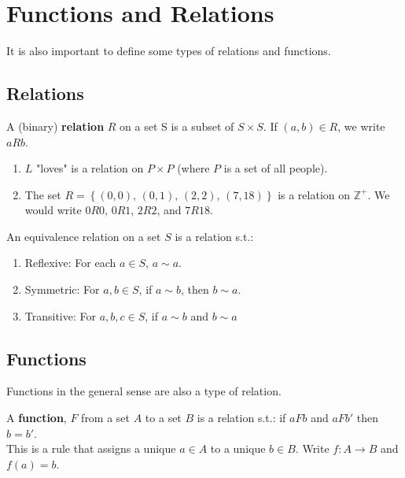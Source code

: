 \documentclass[../main.tex]{subfiles}
\begin{document}
\section{Functions and Relations}

It is also important to define some types of relations and functions.

\subsection{Relations}

\begin{definition}[Relation]
    A (binary) \textbf{relation} \( R \) on a set S is a subset of \( S \times S \). If \( (a,b) \in R \), we write \( aRb \).
\end{definition}

\begin{example}[of relations]

    \begin{enumerate}
        \item \( L \) "loves" is a relation on \( P \times P \) (where \( P \) is a set of all people).
        \item The set \( R = \left\{ (0,0), \, (0,1), \, (2,2), \, (7,18) \right\} \) is a relation on \( \mathbb{Z}^+ \). We would write \( 0R0 \), \( 0R1 \), \( 2R2 \), and \( 7R18 \).
    \end{enumerate}
\end{example}

\begin{definition}
    An equivalence relation on a set \( S \) is a relation s.t.:
    \begin{enumerate}
        \item Reflexive: For each \( a \in S \), \( a \sim a \).
        \item Symmetric: For \( a,b \in S \), if \( a \sim b \), then \( b \sim a \).
        \item Transitive: For \( a,b,c \in S \), if \( a \sim b \) and \( b \sim a \)
    \end{enumerate}
\end{definition}


\subsection{Functions}

Functions in the general sense are also a type of relation.
\begin{definition}[Function]
    A \textbf{function}, \( F \) from a set \( A \) to a set \( B \) is a relation s.t.:
    if \( aFb \) and \( aFb' \) then \( b = b' \). \\
    This is a rule that assigns a unique \( a \in A \) to a unique \( b \in B \).
    Write \( f: A \rightarrow B \) and \( f(a) = b \).
\end{definition}
\end{document}
